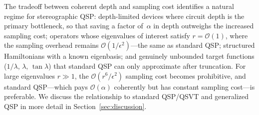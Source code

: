 The tradeoff between coherent depth and sampling cost identifies
a natural regime for stereographic QSP: depth-limited devices
where circuit depth is the primary bottleneck, so that saving a
factor of~$\alpha$ in depth outweighs the increased sampling
cost; operators whose eigenvalues of interest satisfy
$r = \mathcal{O}(1)$, where the sampling overhead remains
$\mathcal{O}(1/\epsilon^2)$---the same as standard QSP;
structured Hamiltonians with a known eigenbasis; and genuinely
unbounded target functions ($1/\lambda$, $\lambda$,
$\tan\lambda$) that standard QSP can only approximate after
truncation.  For large eigenvalues $r \gg 1$, the
$\mathcal{O}(r^6/\epsilon^2)$ sampling cost becomes
prohibitive, and standard QSP---which pays
$\mathcal{O}(\alpha)$ coherently but has constant sampling
cost---is preferable.  We discuss the relationship to standard QSP/QSVT and generalized QSP in more detail in Section~\ref{sec:discussion}.
